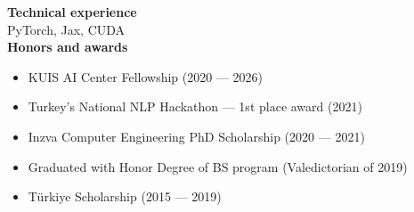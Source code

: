 \documentclass{cv}
\begin{document}
\begin{adjustwidth}{}{\rightedge}
\textbf{Technical experience}
\vspace{0.05in} \\
PyTorch, Jax, CUDA
\vspace{0.05in} \\


\textbf{Honors and awards}
\begin{itemize}
    \item KUIS AI Center Fellowship (2020 --- 2026)
    \item Turkey's National NLP Hackathon --- 1st place award (2021) 
    \item Inzva Computer Engineering PhD Scholarship (2020 --- 2021)
    \item Graduated with Honor Degree of BS program (Valedictorian of 2019)
    \item Türkiye Scholarship (2015 --- 2019)
\end{itemize}
\end{adjustwidth}
\end{document}
